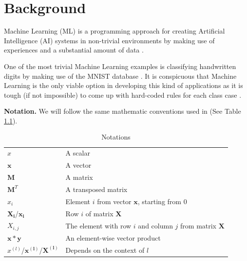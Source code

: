 \chapter{Background} \label{Background}

Machine Learning (ML) is a programming approach for creating Artificial Intelligence (AI) systems in non-trivial environments by making use of experiences and a substantial amount of data \cite{ml, Goodfellow-et-al-2016, russell2016artificial, lecun2015deep}. 

One of the most trivial Machine Learning examples is classifying handwritten digits by making use of the MNIST database \cite{mnist}. It is conspicuous that Machine Learning is the only viable option in developing this kind of applications as it is tough (if not impossible) to come up with hard-coded rules for each class case \cite{Goodfellow-et-al-2016}.

\textbf{Notation.} We will follow the same mathematic conventions used in \cite{Goodfellow-et-al-2016} (See Table \ref{tab: notations}).


\begin{table}[h!]
    \centering
    \begin{tabular}{l l}
        $x$ & A scalar \\
        $\boldsymbol{x}$ & A vector \\
        $\boldsymbol{M}$ & A matrix \\
        $\boldsymbol{M}^T$ & A transposed matrix \\
        $x_{i}$ & Element $i$ from vector $\boldsymbol{x}$, starting from 0 \\
        $\boldsymbol{X_{i}}$/$\boldsymbol{x_{i}}$ & Row $i$ of matrix $\boldsymbol{X}$ \\
        $X_{i, j}$ & The element with row $i$ and column $j$ from matrix $\boldsymbol{X}$ \\
        $\boldsymbol{x} * \boldsymbol{y}$ & An element-wise vector product \\
        $x^{(l)}$/$\boldsymbol{x^{(l)}}$/$\boldsymbol{X^{(l)}}$ & Depends on the context of $l$ \\
    \end{tabular}
    \caption{Notations \cite{Goodfellow-et-al-2016}}
    \label{tab: notations}
\end{table}

